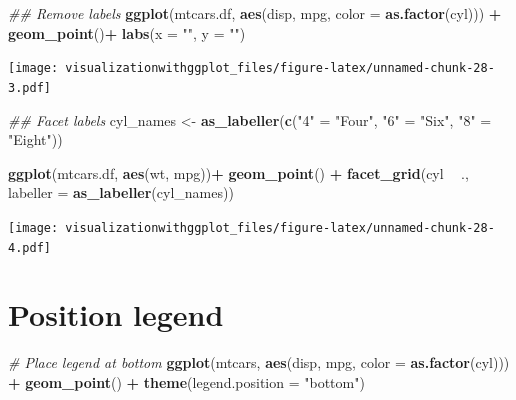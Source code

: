 \documentclass[]{krantz}
\makeatletter
\newenvironment{Shaded}{\begin{snugshade}}{\end{snugshade}}
\newcommand{\CommentTok}[1]{\textcolor[rgb]{0.56,0.35,0.01}{\textit{#1}}}
\newcommand{\DataTypeTok}[1]{\textcolor[rgb]{0.13,0.29,0.53}{#1}}
\newcommand{\KeywordTok}[1]{\textcolor[rgb]{0.13,0.29,0.53}{\textbf{#1}}}
\newcommand{\NormalTok}[1]{#1}
\newcommand{\OperatorTok}[1]{\textcolor[rgb]{0.81,0.36,0.00}{\textbf{#1}}}
\newcommand{\StringTok}[1]{\textcolor[rgb]{0.31,0.60,0.02}{#1}}
\newenvironment{kframe}{%
\medskip{}
\setlength{\fboxsep}{.8em}
 \def\at@end@of@kframe{}%
 \ifinner\ifhmode%
  \def\at@end@of@kframe{\end{minipage}}%
  \begin{minipage}{\columnwidth}%
 \fi\fi%
 \def\FrameCommand##1{\hskip\@totalleftmargin \hskip-\fboxsep
 \colorbox{shadecolor}{##1}\hskip-\fboxsep
     \hskip-\linewidth \hskip-\@totalleftmargin \hskip\columnwidth}%
 \MakeFramed {\advance\hsize-\width
   \@totalleftmargin\z@ \linewidth\hsize
   \@setminipage}}%
 {\par\unskip\endMakeFramed%
 \at@end@of@kframe}
\renewenvironment{Shaded}{\begin{kframe}}{\end{kframe}}
\makeatother
\begin{document}
\begin{Shaded}
\begin{Highlighting}[]
\CommentTok{## Remove labels }
\KeywordTok{ggplot}\NormalTok{(mtcars.df, }\KeywordTok{aes}\NormalTok{(disp,  mpg, }\DataTypeTok{color =} \KeywordTok{as.factor}\NormalTok{(cyl))) }\OperatorTok{+}\StringTok{ }
\StringTok{  }\KeywordTok{geom_point}\NormalTok{()}\OperatorTok{+}
\StringTok{  }\KeywordTok{labs}\NormalTok{(}\DataTypeTok{x =} \StringTok{""}\NormalTok{, }\DataTypeTok{y =} \StringTok{""}\NormalTok{)}
\end{Highlighting}
\end{Shaded}

\texttt{[image: visualizationwithggplot\_files/figure-latex/unnamed-chunk-28-3.pdf]}

\begin{Shaded}
\begin{Highlighting}[]
\CommentTok{## Facet labels }
\NormalTok{cyl_names <-}\StringTok{ }\KeywordTok{as_labeller}\NormalTok{(}\KeywordTok{c}\NormalTok{(}\StringTok{"4"}\NormalTok{ =}\StringTok{ "Four"}\NormalTok{, }\StringTok{"6"}\NormalTok{ =}\StringTok{ "Six"}\NormalTok{, }\StringTok{"8"}\NormalTok{ =}\StringTok{ "Eight"}\NormalTok{))}

 \KeywordTok{ggplot}\NormalTok{(mtcars.df, }\KeywordTok{aes}\NormalTok{(wt, mpg))}\OperatorTok{+}\StringTok{ }
\StringTok{   }\KeywordTok{geom_point}\NormalTok{() }\OperatorTok{+}
\StringTok{   }\KeywordTok{facet_grid}\NormalTok{(cyl }\OperatorTok{~}\StringTok{ }\NormalTok{., }\DataTypeTok{labeller =} \KeywordTok{as_labeller}\NormalTok{(cyl_names))}
\end{Highlighting}
\end{Shaded}

\texttt{[image: visualizationwithggplot\_files/figure-latex/unnamed-chunk-28-4.pdf]}

\hypertarget{position-legend}{%
\section{Position legend}\label{position-legend}}

\begin{Shaded}
\begin{Highlighting}[]
\CommentTok{# Place legend at bottom}
\KeywordTok{ggplot}\NormalTok{(mtcars, }\KeywordTok{aes}\NormalTok{(disp,  mpg, }\DataTypeTok{color =} \KeywordTok{as.factor}\NormalTok{(cyl))) }\OperatorTok{+}\StringTok{ }\KeywordTok{geom_point}\NormalTok{() }\OperatorTok{+}
\StringTok{  }\KeywordTok{theme}\NormalTok{(}\DataTypeTok{legend.position =} \StringTok{"bottom"}\NormalTok{)}
\end{Highlighting}
\end{Shaded}
\end{document}
